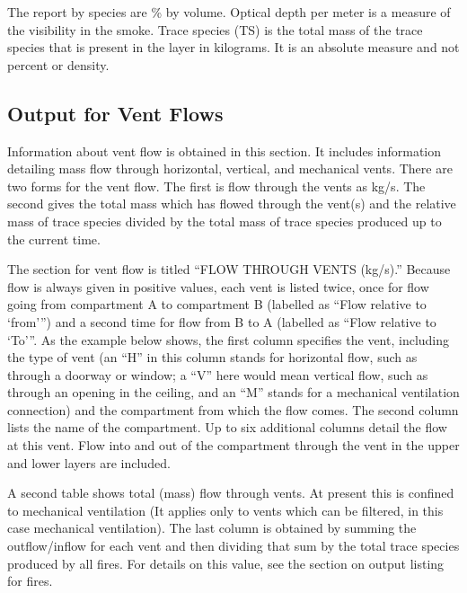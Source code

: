 The report by species are \% by volume. Optical depth per meter is a measure of the visibility in the smoke. Trace species (TS) is the total mass of the trace species that is present in the layer in kilograms. It is an absolute measure and not percent or density.

\subsection{Output for Vent Flows}
Information about vent flow is obtained in this section.  It includes information detailing mass flow through horizontal, vertical, and mechanical vents. There are two forms for the vent flow. The first is flow through the vents as kg/s. The second gives the total mass which has flowed through the vent(s) and the relative mass of trace species divided by the total mass of trace species produced up to the current time.

The section for vent flow is titled ``FLOW THROUGH VENTS (kg/s).''  Because flow is always given in positive values, each vent is listed twice, once for flow going from compartment A to compartment B (labelled as ``Flow relative to `from''') and a second time for flow from B to A (labelled as ``Flow relative to `To'''.  As the example below shows, the first column specifies the vent, including the type of vent (an ``H'' in this column stands for horizontal flow, such as through a doorway or window; a ``V'' here would mean vertical flow, such as through an opening in the ceiling, and an ``M'' stands for a mechanical ventilation connection) and the compartment from which the flow comes. The second column lists the name of the compartment. Up to six additional columns detail the flow at this vent. Flow into and out of the compartment through the vent in the upper and lower layers are included.

A second table shows total (mass) flow through vents. At present this is confined to mechanical ventilation (It applies only to vents which can be filtered, in this case mechanical ventilation). The last column is obtained by summing the outflow/inflow for each vent and then dividing that sum by the total trace species produced by all fires. For details on this value, see the section on output listing for fires.

